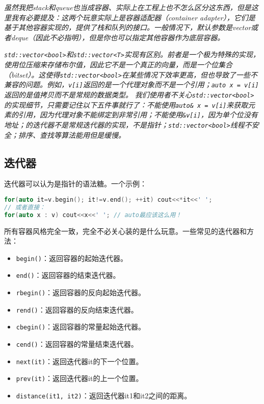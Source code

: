 \documentclass[../main.tex]{subfiles}
\begin{document}
\emph{
  虽然我把stack和queue也当成容器、实际上在工程上也不怎么区分这东西，但是这里我有必要提及：这两个玩意实际上是容器适配器（container adapter），它们是基于其他容器实现的，提供了栈和队列的接口。一般情况下，默认参数是vector或者deque（因此不必指明），但是你也可以指定其他容器作为底层容器。
}

\emph{
  \texttt{std::vector<bool>}和\texttt{std::vector<T>}实现有区别。前者是一个极为特殊的实现，使用位压缩来存储布尔值，因此它不是一个真正的向量，而是一个位集合（bitset）。这使得\texttt{std::vector<bool>}在某些情况下效率更高，但也导致了一些不兼容的问题。例如，\texttt{v[i]}返回的是一个代理对象而不是一个引用；\texttt{auto x = v[i]}返回的是值拷贝而不是常规的数据类型。
}
\emph{
  我们使用者不关心\texttt{std::vector<bool>}的实现细节，只需要记住以下五件事就行了：不能使用\texttt{auto\& x = v[i]}来获取元素的引用，因为代理对象不能绑定到非常引用；不能使用\texttt{\&v[i]}，因为单个位没有地址；的迭代器不是常规迭代器的实现，不是指针；\texttt{std::vector<bool>}线程不安全；排序、查找等算法能用但是缓慢。
}

\subsection{迭代器}

迭代器可以认为是指针的语法糖。一个示例：
\begin{lstlisting}[language=C++]
for(auto it=v.begin(); it!=v.end(); ++it) cout<<*it<<' ';
// 或者直接：
for(auto x : v) cout<<x<<' '; // auto最应该这么用！
\end{lstlisting}

所有容器风格完全一致，完全不必关心装的是什么玩意。一些常见的迭代器和方法：
\begin{itemize}
  \item \texttt{begin()}：返回容器的起始迭代器。
  \item \texttt{end()}：返回容器的结束迭代器。
  \item \texttt{rbegin()}：返回容器的反向起始迭代器。
  \item \texttt{rend()}：返回容器的反向结束迭代器。
  \item \texttt{cbegin()}：返回容器的常量起始迭代器。
  \item \texttt{cend()}：返回容器的常量结束迭代器。
  \item \texttt{next(it)}：返回迭代器it的下一个位置。
  \item \texttt{prev(it)}：返回迭代器it的上一个位置。
  \item \texttt{distance(it1, it2)}：返回迭代器it1和it2之间的距离。
\end{itemize}
\end{document}
